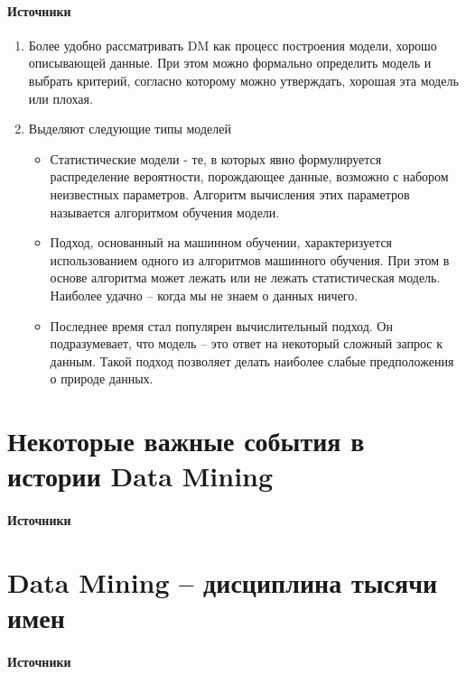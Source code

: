 \documentclass[10pt,a4paper]{article}
\begin{document}
\paragraph{Источники} \cite{mmds}

\begin{enumerate}
\item Более удобно рассматривать DM как процесс построения модели, хорошо описывающей данные. При этом можно формально определить модель и выбрать критерий, согласно которому можно утверждать, хорошая эта модель или плохая.
\item Выделяют следующие типы моделей
\begin{itemize}
\item Статистические модели - те, в которых явно формулируется распределение вероятности, порождающее данные, возможно с набором неизвестных параметров. Алгоритм вычисления этих параметров называется алгоритмом обучения модели.
\item Подход, основанный на машинном обучении, характеризуется использованием одного из алгоритмов машинного обучения. При этом в основе алгоритма может лежать или не лежать статистическая модель. Наиболее удачно -- когда мы не знаем о данных ничего.
\item Последнее время стал популярен вычислительный подход. Он подразумевает, что модель -- это ответ на некоторый сложный запрос к данным. Такой подход позволяет делать наиболее слабые предположения о природе данных.
\end{itemize}
\end{enumerate}


\section{Некоторые важные события в истории Data Mining}

\paragraph{Источники} \cite{journeys}


\section{Data Mining -- дисциплина тысячи имен}

\paragraph{Источники} \cite{journeys}
\end{document}
